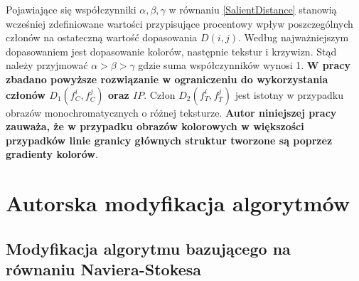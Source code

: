 \documentclass[a4paper,12pt,twoside,openany]{report}
\begin{document}
Pojawiające się współczynniki $\alpha ,\beta ,\gamma $ w równaniu \eqref{SalientDistance} stanowią wcześniej zdefiniowane wartości przypisujące procentowy wpływ poszczególnych członów na ostateczną wartość dopasowania $D(i,j)$. Według \cite{SalientStrucTexProp} najważniejszym dopasowaniem jest dopasowanie kolorów, następnie tekstur i krzywizn. Stąd należy przyjmować $\alpha >\beta >\gamma $ gdzie suma współczynników wynosi 1. \textbf{W pracy zbadano powyższe rozwiązanie w ograniczeniu do wykorzystania członów $D_1\left(f^i_C,f^j_C\right)$ oraz $IP$}. Człon $D_2\left(f^i_T,f^j_T\right)$ jest istotny w przypadku obrazów monochromatycznych o różnej teksturze. \textbf{Autor niniejszej pracy zauważa, że w przypadku obrazów kolorowych w większości przypadków linie granicy głównych struktur tworzone są poprzez gradienty kolorów}.
\chapter{Autorska modyfikacja algorytmów}
\section{Modyfikacja algorytmu bazującego na równaniu Naviera-Stokesa}
\end{document}
